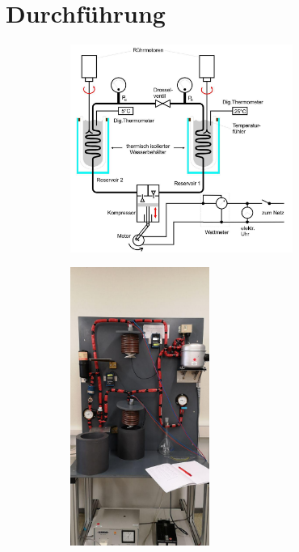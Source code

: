 \section{Durchführung}
\begin{figure}[h]
    \begin{subfigure}[c]{0.5\textwidth}
        \centering
        \includegraphics[width=0.8\textwidth, height=0.9\textwidth]{bilder/aufbau_spezifisch.jpg}
        \label{fig:aufbau_spezifisch}
    \end{subfigure}
    \begin{subfigure}[c]{0.5\textwidth}
        \centering
        \includegraphics[width=0.5\textwidth, height=0.9\textwidth]{bilder/aufbau_foto.jpg}
        \label{fig:aufbau_foto}
    \end{subfigure}
\end{figure}
